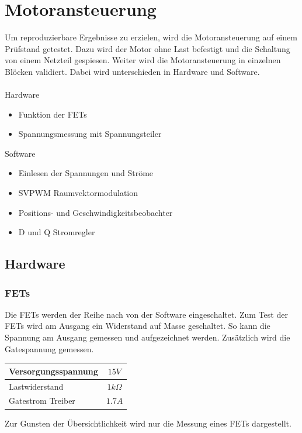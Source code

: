 \section{Motoransteuerung} \label{ValidMotoransteuerung}
Um reproduzierbare Ergebnisse zu erzielen, wird die Motoransteuerung auf einem Prüfstand getestet. Dazu wird der Motor ohne Last befestigt und die Schaltung von einem Netzteil gespiesen. Weiter wird die Motoransteuerung in einzelnen Blöcken validiert. Dabei wird unterschieden in Hardware und Software.\\
\\
Hardware
\begin{itemize}
	\item Funktion der FETs
	\item Spannungsmessung mit Spannungsteiler
\end{itemize}
Software
\begin{itemize}
	\item Einlesen der Spannungen und Ströme
	\item SVPWM Raumvektormodulation
	\item Positions- und Geschwindigkeitsbeobachter
	\item D und Q Stromregler
\end{itemize}

\subsection{Hardware}
\subsubsection*{FETs}
Die FETs werden der Reihe nach von der Software eingeschaltet. Zum Test der FETs wird am Ausgang ein Widerstand auf Masse geschaltet. So kann die Spannung am Ausgang gemessen und aufgezeichnet werden. Zusätzlich wird die Gatespannung gemessen.

\begin{center}
	\begin{tabular}{l|c}
		\hline 
		Versorgungsspannung & $15V$ \\ \hline
		Lastwiderstand & $1k\Omega$ \\ \hline
		Gatestrom Treiber & $1.7A$ \\ \hline
	\end{tabular} 
	\label{tab:fetmessbed}
\end{center}

Zur Gunsten der Übersichtlichkeit wird nur die Messung eines FETs dargestellt.

